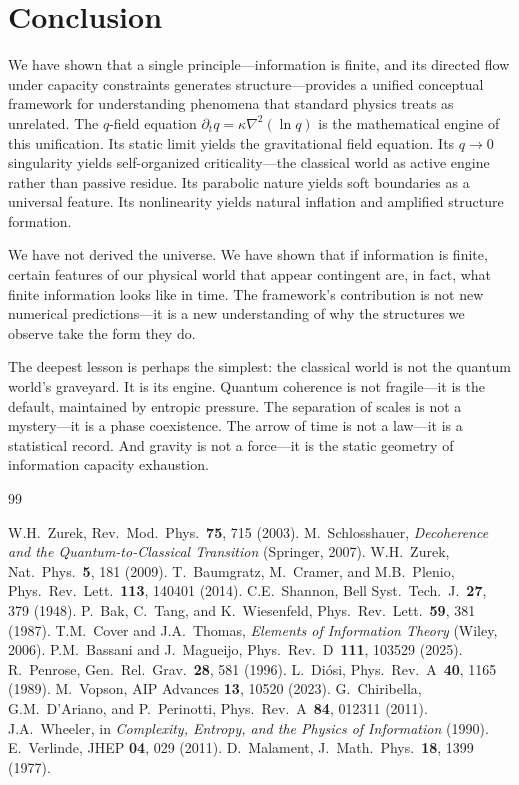 \documentclass[12pt]{article}
\begin{document}
\section{Conclusion}

We have shown that a single principle---information is finite, and its directed flow under capacity constraints generates structure---provides a unified conceptual framework for understanding phenomena that standard physics treats as unrelated. The $q$-field equation $\partial_t q = \kappa\nabla^2(\ln q)$ is the mathematical engine of this unification. Its static limit yields the gravitational field equation. Its $q\to 0$ singularity yields self-organized criticality---the classical world as active engine rather than passive residue. Its parabolic nature yields soft boundaries as a universal feature. Its nonlinearity yields natural inflation and amplified structure formation.

We have not derived the universe. We have shown that if information is finite, certain features of our physical world that appear contingent are, in fact, what finite information looks like in time. The framework's contribution is not new numerical predictions---it is a new understanding of why the structures we observe take the form they do.

The deepest lesson is perhaps the simplest: the classical world is not the quantum world's graveyard. It is its engine. Quantum coherence is not fragile---it is the default, maintained by entropic pressure. The separation of scales is not a mystery---it is a phase coexistence. The arrow of time is not a law---it is a statistical record. And gravity is not a force---it is the static geometry of information capacity exhaustion.

\begin{thebibliography}{99}

 W.H.~Zurek, Rev.~Mod.~Phys.~\textbf{75}, 715 (2003).
 M.~Schlosshauer, \emph{Decoherence and the Quantum-to-Classical Transition} (Springer, 2007).
 W.H.~Zurek, Nat.~Phys.~\textbf{5}, 181 (2009).
 T.~Baumgratz, M.~Cramer, and M.B.~Plenio, Phys.~Rev.~Lett.~\textbf{113}, 140401 (2014).
 C.E.~Shannon, Bell Syst.~Tech.~J.~\textbf{27}, 379 (1948).
 P.~Bak, C.~Tang, and K.~Wiesenfeld, Phys.~Rev.~Lett.~\textbf{59}, 381 (1987).
 T.M.~Cover and J.A.~Thomas, \emph{Elements of Information Theory} (Wiley, 2006).
 P.M.~Bassani and J.~Magueijo, Phys.~Rev.~D~\textbf{111}, 103529 (2025).
 R.~Penrose, Gen.~Rel.~Grav.~\textbf{28}, 581 (1996).
 L.~Di\'osi, Phys.~Rev.~A~\textbf{40}, 1165 (1989).
 M.~Vopson, AIP Advances \textbf{13}, 10520 (2023).
 G.~Chiribella, G.M.~D'Ariano, and P.~Perinotti, Phys.~Rev.~A~\textbf{84}, 012311 (2011).
 J.A.~Wheeler, in \emph{Complexity, Entropy, and the Physics of Information} (1990).
 E.~Verlinde, JHEP \textbf{04}, 029 (2011).
 D.~Malament, J.~Math.~Phys.~\textbf{18}, 1399 (1977).

\end{thebibliography}
\end{document}
